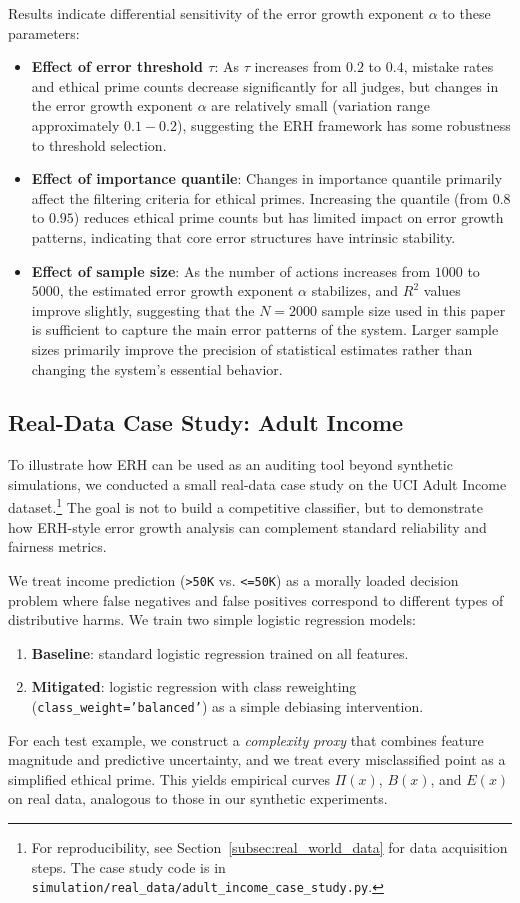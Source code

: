 \documentclass[12pt,a4paper]{article}
\theoremstyle{definition}
\theoremstyle{remark}
\begin{document}
Results indicate differential sensitivity of the error growth exponent $\alpha$ to these parameters:
\begin{itemize}
    \item \textbf{Effect of error threshold $\tau$}: As $\tau$ increases from $0.2$ to $0.4$, mistake rates and ethical prime counts decrease significantly for all judges, but changes in the error growth exponent $\alpha$ are relatively small (variation range approximately $0.1-0.2$), suggesting the ERH framework has some robustness to threshold selection.
    \item \textbf{Effect of importance quantile}: Changes in importance quantile primarily affect the filtering criteria for ethical primes. Increasing the quantile (from $0.8$ to $0.95$) reduces ethical prime counts but has limited impact on error growth patterns, indicating that core error structures have intrinsic stability.
    \item \textbf{Effect of sample size}: As the number of actions increases from $1000$ to $5000$, the estimated error growth exponent $\alpha$ stabilizes, and $R^2$ values improve slightly, suggesting that the $N=2000$ sample size used in this paper is sufficient to capture the main error patterns of the system. Larger sample sizes primarily improve the precision of statistical estimates rather than changing the system's essential behavior.
\end{itemize}

\subsection{Real-Data Case Study: Adult Income}
\label{subsec:real_data}

To illustrate how ERH can be used as an auditing tool beyond synthetic simulations, we conducted a small real-data case study on the UCI Adult Income dataset.\footnote{For reproducibility, see Section~\ref{subsec:real_world_data} for data acquisition steps. The case study code is in \texttt{simulation/real\_data/adult\_income\_case\_study.py}.}
The goal is not to build a competitive classifier, but to demonstrate how ERH-style error growth analysis can complement standard reliability and fairness metrics.

We treat income prediction (\texttt{>50K} vs. \texttt{\textless=50K}) as a morally loaded decision problem where false negatives and false positives correspond to different types of distributive harms.
We train two simple logistic regression models:
\begin{enumerate}
    \item \textbf{Baseline}: standard logistic regression trained on all features.
    \item \textbf{Mitigated}: logistic regression with class reweighting (\texttt{class\_weight='balanced'}) as a simple debiasing intervention.
\end{enumerate}
For each test example, we construct a \emph{complexity proxy} that combines feature magnitude and predictive uncertainty, and we treat every misclassified point as a simplified ethical prime.
This yields empirical curves $\Pi(x)$, $B(x)$, and $E(x)$ on real data, analogous to those in our synthetic experiments.
\end{document}
